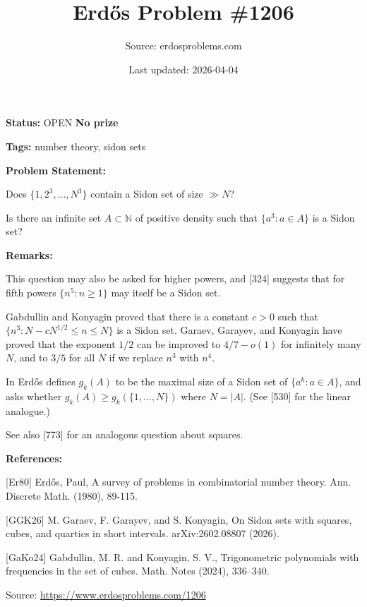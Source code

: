 \documentclass{article}
\title{Erd\H{o}s Problem \#1206}
\date{Last updated: 2026-04-04}
\author{Source: erdosproblems.com}
\begin{document}
\maketitle

\noindent\textbf{Status:} OPEN \quad \textbf{No prize}

\noindent\textbf{Tags:} number theory, sidon sets

\medskip
\noindent\textbf{Problem Statement:}

Does $\{1,2^3,\ldots,N^3\}$ contain a Sidon set of size $\gg N$?

Is there an infinite set $A\subset \mathbb{N}$ of positive density such that $\{a^3 : a\in A\}$ is a Sidon set?

\bigskip
\noindent\textbf{Remarks:}

This question may also be asked for higher powers, and [324] suggests that for fifth powers $\{n^5 :n\geq 1\}$ may itself be a Sidon set.

Gabdullin and Konyagin \cite{GaKo24} proved that there is a constant $c>0$ such that $\{ n^3 : N-cN^{1/2}\leq n\leq N\}$ is a Sidon set. Garaev, Garayev, and Konyagin \cite{GGK26} have proved that the exponent $1/2$ can be improved to $4/7-o(1)$ for infinitely many $N$, and to $3/5$ for all $N$ if we replace $n^3$ with $n^4$.

In \cite{Er80} Erd\H{o}s defines $g_k(A)$ to be the maximal size of a Sidon set of $\{a^k : a\in A\}$, and asks whether $g_k(A)\geq g_k(\{1,\ldots,N\})$ where $N=\lvert A\rvert$. (See [530] for the linear analogue.)

See also [773] for an analogous question about squares.

\bigskip
\noindent\textbf{References:}

[Er80] Erd\H{o}s, Paul, A survey of problems in combinatorial number theory. Ann. Discrete Math. (1980), 89-115.
 
 [GGK26] M. Garaev, F. Garayev, and S. Konyagin, On Sidon sets with squares, cubes, and quartics in short intervals. arXiv:2602.08807 (2026).
 
 [GaKo24] Gabdullin, M. R. and Konyagin, S. V., Trigonometric polynomials with frequencies in the set of
cubes. Math. Notes (2024), 336--340.

\bigskip
\noindent\small{Source: \url{https://www.erdosproblems.com/1206}}
\end{document}
